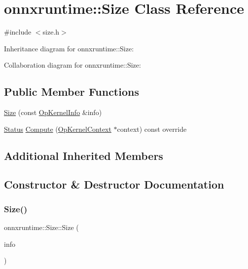 \hypertarget{classonnxruntime_1_1Size}{}\section{onnxruntime\+:\+:Size Class Reference}
\label{classonnxruntime_1_1Size}


{\ttfamily \#include $<$size.\+h$>$}



Inheritance diagram for onnxruntime\+:\+:Size\+:


Collaboration diagram for onnxruntime\+:\+:Size\+:
\subsection*{Public Member Functions}
\begin{DoxyCompactItemize}
\item 
\mbox{\hyperlink{classonnxruntime_1_1Size_a594077ed5f73691a59238d7f7c75d7e3}{Size}} (const \mbox{\hyperlink{classonnxruntime_1_1OpKernelInfo}{Op\+Kernel\+Info}} \&info)
\item 
\mbox{\hyperlink{classonnxruntime_1_1common_1_1Status}{Status}} \mbox{\hyperlink{classonnxruntime_1_1Size_ae622eb20d1b354af665deca538f0052a}{Compute}} (\mbox{\hyperlink{classonnxruntime_1_1OpKernelContext}{Op\+Kernel\+Context}} $\ast$context) const override
\end{DoxyCompactItemize}
\subsection*{Additional Inherited Members}


\subsection{Constructor \& Destructor Documentation}
\mbox{\label{classonnxruntime_1_1Size_a594077ed5f73691a59238d7f7c75d7e3}} 
\subsubsection{\texorpdfstring{Size()}{Size()}}
{\footnotesize\ttfamily onnxruntime\+::\+Size\+::\+Size (\begin{DoxyParamCaption}\item[{const \mbox{\hyperlink{classonnxruntime_1_1OpKernelInfo}{Op\+Kernel\+Info}} \&}]{info }\end{DoxyParamCaption})\hspace{0.3cm}{\ttfamily [inline]}}



